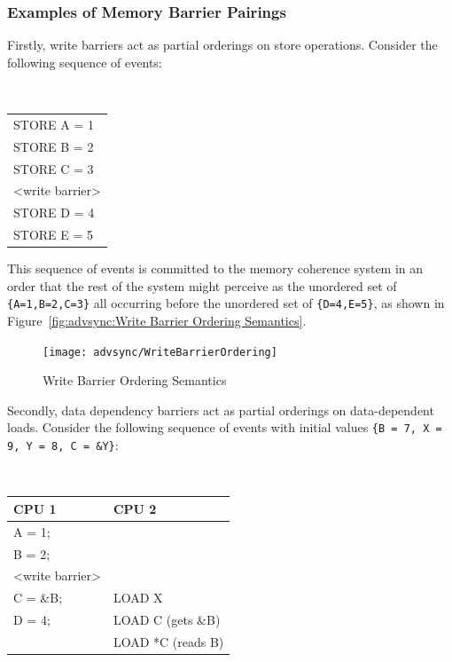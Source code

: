 \subsubsection{Examples of Memory Barrier Pairings}
\label{sec:advsync:Examples of Memory Barrier Pairings}

Firstly, write barriers act as partial orderings on store operations.
Consider the following sequence of events:

\vspace{5pt}
\begin{minipage}[t]{\columnwidth}
\tt
\scriptsize
\begin{tabular}{l}
	STORE A = 1 \\
	STORE B = 2 \\
	STORE C = 3 \\
	<write barrier> \\
	STORE D = 4 \\
	STORE E = 5 \\
\end{tabular}
\end{minipage}
\vspace{5pt}

This sequence of events is committed to the memory coherence system in an order
that the rest of the system might perceive as the unordered set of
{\tt \{A=1,B=2,C=3\}}
all occurring before the unordered set of
{\tt \{D=4,E=5\}}, as shown in
Figure~\ref{fig:advsync:Write Barrier Ordering Semantics}.

\begin{figure}[htb]
\begin{center}
\texttt{[image: advsync/WriteBarrierOrdering]}
\end{center}
\caption{Write Barrier Ordering Semantics}
\end{figure}

Secondly, data dependency barriers act as partial orderings on data-dependent
loads.  Consider the following sequence of events with initial values
{\tt \{B = 7, X = 9, Y = 8, C = \&Y\}}:

\vspace{5pt}
\begin{minipage}[t]{\columnwidth}
\tt
\scriptsize
\begin{tabular}{l|p{1.5in}}
	CPU 1 &		CPU 2 \\
	\hline
	A = 1; & \\
	B = 2; & \\
	<write barrier> & \\
	C = \&B; & 	LOAD X\\
	D = 4;	&	LOAD C (gets \&B) \\
		&	LOAD *C (reads B) \\
\end{tabular}
\end{minipage}
\vspace{5pt}


